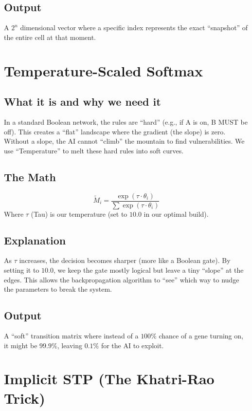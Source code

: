 \documentclass[11pt,a4paper]{article}
\begin{document}
\subsection*{Output}
A $2^n$ dimensional vector where a specific index represents the exact ``snapshot'' of the entire cell at that moment.

\section{Temperature-Scaled Softmax}

\subsection*{What it is and why we need it}
In a standard Boolean network, the rules are ``hard'' (e.g., if A is on, B MUST be off). This creates a ``flat'' landscape where the gradient (the slope) is zero. Without a slope, the AI cannot ``climb'' the mountain to find vulnerabilities. We use ``Temperature'' to melt these hard rules into soft curves.

\subsection*{The Math}
\begin{equation}
\tilde{M}_i = \frac{\exp(\tau \cdot \theta_i)}{\sum \exp(\tau \cdot \theta_i)}
\end{equation}
Where $\tau$ (Tau) is our temperature (set to $10.0$ in our optimal build).

\subsection*{Explanation}
As $\tau$ increases, the decision becomes sharper (more like a Boolean gate). By setting it to $10.0$, we keep the gate mostly logical but leave a tiny ``slope'' at the edges. This allows the backpropagation algorithm to ``see'' which way to nudge the parameters to break the system.

\subsection*{Output}
A ``soft'' transition matrix where instead of a $100\%$ chance of a gene turning on, it might be $99.9\%$, leaving $0.1\%$ for the AI to exploit.

\section{Implicit STP (The Khatri-Rao Trick)}
\end{document}
